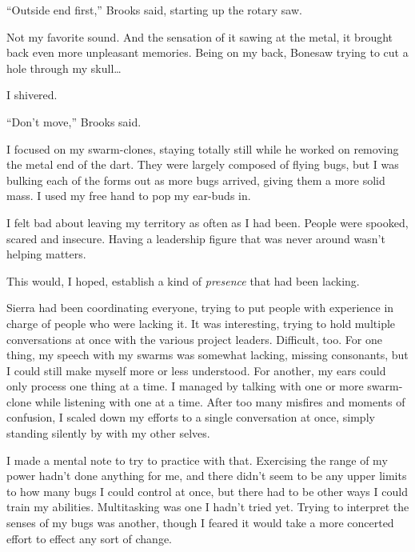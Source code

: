 ``Outside end first,'' Brooks said, starting up the rotary saw.



Not my favorite sound.  And the sensation of it sawing at the metal, it brought back even more unpleasant memories.  Being on my back, Bonesaw trying to cut a hole through my skull\ldots



I shivered.



``Don't move,'' Brooks said.



I focused on my swarm-clones, staying totally still while he worked on removing the metal end of the dart.  They were largely composed of flying bugs, but I was bulking each of the forms out as more bugs arrived, giving them a more solid mass.  I used my free hand to pop my ear-buds in.



I felt bad about leaving my territory as often as I had been.  People were spooked, scared and insecure.  Having a leadership figure that was never around wasn't helping matters.



This would, I hoped, establish a kind of \emph{presence} that had been lacking.



Sierra had been coordinating everyone, trying to put people with experience in charge of people who were lacking it.  It was interesting, trying to hold multiple conversations at once with the various project leaders.  Difficult, too.  For one thing, my speech with my swarms was somewhat lacking, missing consonants, but I could still make myself more or less understood.  For another, my ears could only process one thing at a time.  I managed by talking with one or more swarm-clone while listening with one at a time.  After too many misfires and moments of confusion, I scaled down my efforts to a single conversation at once, simply standing silently by with my other selves.



I made a mental note to try to practice with that.  Exercising the range of my power hadn't done anything for me, and there didn't seem to be any upper limits to how many bugs I could control at once, but there had to be other ways I could train my abilities.  Multitasking was one I hadn't tried yet.  Trying to interpret the senses of my bugs was another, though I feared it would take a more concerted effort to effect any sort of change.



